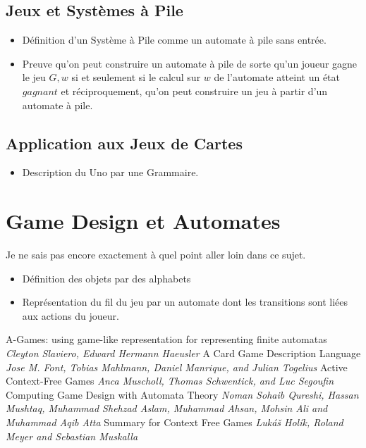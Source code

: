 \documentclass{cours}
\begin{document}
\subsection{Jeux et Systèmes à Pile}
\begin{itemize}
    \item Définition d'un Système à Pile comme un automate à pile sans entrée.
    \item Preuve qu'on peut construire un automate à pile de sorte qu'un joueur gagne le jeu $G, w$ si et seulement si le calcul sur $w$ de l'automate atteint un état $gagnant$ et réciproquement, qu'on peut construire un jeu à partir d'un automate à pile.
\end{itemize}

\subsection{Application aux Jeux de Cartes}
\begin{itemize}
    \item Description du Uno par une Grammaire.
\end{itemize}


\section{Game Design et Automates}
Je ne sais pas encore exactement à quel point aller loin dans ce sujet.
\begin{itemize}
    \item Définition des objets par des alphabets
    \item Représentation du fil du jeu par un automate dont les transitions sont liées aux actions du joueur.
\end{itemize}


\begin{thebibliography}{5}
     A-Games: using game-like representation for representing finite automatas \textit{Cleyton Slaviero, Edward Hermann Haeusler}
     A Card Game Description Language \textit{Jose M. Font, Tobias Mahlmann, Daniel Manrique, and Julian Togelius}
     Active Context-Free Games \textit{Anca Muscholl, Thomas Schwentick, and Luc Segoufin}
     Computing Game Design with Automata Theory \textit{Noman Sohaib Qureshi, Hassan Mushtaq, Muhammad Shehzad Aslam, Muhammad Ahsan, Mohsin Ali and Muhammad Aqib Atta}
     Summary for Context Free Games \textit{Lukáš Holík, Roland Meyer and Sebastian Muskalla}
\end{thebibliography}
\end{document}

